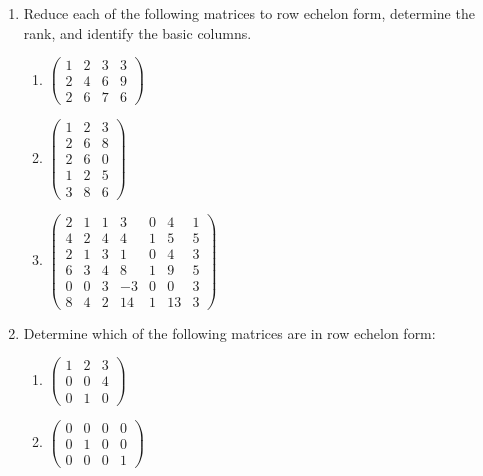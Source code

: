 \documentclass[10pt, a4paper]{article}
\begin{document}
\begin{enumerate}[leftmargin=*, label=\bfseries 2.1.\arabic*]

\item Reduce each of the following matrices to row echelon form, determine the rank, and identify the basic columns.

\begin{enumerate}[label=(\alph*)]
    \item $\begin{pmatrix}
        1 & 2 & 3 & 3 \\
        2 & 4 & 6 & 9 \\
        2 & 6 & 7 & 6
    \end{pmatrix}$
    
    \item $\begin{pmatrix}
        1 & 2 & 3 \\
        2 & 6 & 8 \\
        2 & 6 & 0 \\
        1 & 2 & 5 \\
        3 & 8 & 6
    \end{pmatrix}$
    
    \item $\begin{pmatrix}
        2 & 1 & 1 & 3 & 0 & 4 & 1 \\
        4 & 2 & 4 & 4 & 1 & 5 & 5 \\
        2 & 1 & 3 & 1 & 0 & 4 & 3 \\
        6 & 3 & 4 & 8 & 1 & 9 & 5 \\
        0 & 0 & 3 & -3 & 0 & 0 & 3 \\
        8 & 4 & 2 & 14 & 1 & 13 & 3
    \end{pmatrix}$
\end{enumerate}

\item Determine which of the following matrices are in row echelon form:

\begin{enumerate}[label=(\alph*)]
    \item $\begin{pmatrix}
        1 & 2 & 3 \\
        0 & 0 & 4 \\
        0 & 1 & 0
    \end{pmatrix}$
    
    \item $\begin{pmatrix}
        0 & 0 & 0 & 0 \\
        0 & 1 & 0 & 0 \\
        0 & 0 & 0 & 1
    \end{pmatrix}$
    

\end{enumerate}
\end{enumerate}
\end{document}
